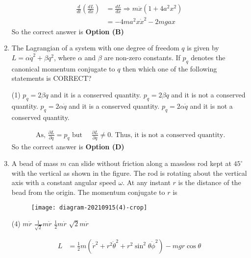 \begin{enumerate}
\begin{answer}
\begin{align*}
	\frac{d}{d t}\left(\frac{d L}{d \dot{x}}\right)&=\frac{d L}{d x} \Rightarrow m \ddot{x}\left(1+4 a^{2} x^{2}\right)\\&=-4 m a^{2} x \dot{x}^{2}-2 m g a x
	\end{align*}
	So the correct answer is \textbf{Option (B)}
\end{answer}
	\item The Lagrangian of a system with one degree of freedom $q$ is given by $L=\alpha \dot{q}^{2}+\beta q^{2}$, where $\alpha$ and $\beta$ are non-zero constants. If $p_{q}$ denotes the canonical momentum conjugate to $q$ then which one of the following statements is CORRECT?
	{}
	\begin{tasks}(1)
		\task[\textbf{A.}] $p_{q}=2 \beta q$ and it is a conserved quantity.
		\task[\textbf{B.}]  $p_{q}=2 \beta q$ and it is not a conserved quantity.
		\task[\textbf{C.}] $p_{q}=2 \alpha \dot{q}$ and it is a conserved quantity.
		\task[\textbf{D.}]  $p_{q}=2 \alpha \dot{q}$ and it is not a conserved quantity.
	\end{tasks}
\begin{answer}
	\begin{align*}
	\text{	As, }\frac{\partial L}{\partial \dot{q}}=p_{q}\text{ but }\quad \frac{\partial L}{\partial q} \neq 0.\text{ Thus, it is not a conserved quantity.}
	\end{align*}
	So the correct answer is \textbf{Option (D)}
\end{answer}
	\item A bead of mass $m$ can slide without friction along a massless rod kept at $45^{\circ}$ with the vertical as shown in the figure. The rod is rotating about the vertical axis with a constant angular speed $\omega$. At any instant $r$ is the distance of the bead from the origin. The momentum conjugate to $r$ is
	{}
	\begin{figure}[H]
		\centering
		\texttt{[image: diagram-20210915(4)-crop]}
	\end{figure}
	\begin{tasks}(4)
		\task[\textbf{A.}] $m \dot{r}$
		\task[\textbf{B.}] $\frac{1}{\sqrt{2}} m \dot{r}$
		\task[\textbf{C.}] $\frac{1}{2} m \dot{r}$
		\task[\textbf{D.}] $\sqrt{2} m \dot{r}$
	\end{tasks}
\begin{answer}
	\begin{align*}
	L&=\frac{1}{2} m\left(\dot{r}^{2}+r^{2} \dot{\theta}^{2}+r^{2} \sin ^{2} \theta \dot{\phi}^{2}\right)-m g r \cos \theta\\

\end{align*}
\end{answer}
\end{enumerate}
